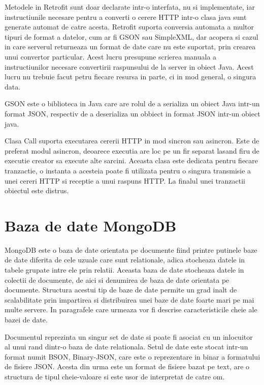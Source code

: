 Metodele in Retrofit sunt doar declarate intr-o interfata, nu si implementate, iar instructiunile necesare pentru a converti o cerere HTTP intr-o clasa java 
sunt generate automat de catre acesta. Retrofit suporta conversia automata a multor tipuri de format a datelor, cum ar fi GSON sau SimpleXML, dar acopera si 
cazul in care serverul returneaza un format de date care nu este suportat, prin crearea unui convertor particular. Acest lucru presupune scrierea 
manuala a instructiunilor necesare convertirii raspunsului de la server in obiect Java. Acest lucru nu trebuie facut petru fiecare resursa in parte, ci 
in mod general, o singura data.

GSON este o biblioteca in Java care are rolul de a serializa un obiect Java intr-un format JSON, respectiv de a deserializa un obbiect in format JSON intr-un 
obiect java.   

Clasa Call suporta executarea cererii HTTP in mod sincron sau asincron. Este de preferat modul asincron, deoarece executia are loc pe un fir separat lasand 
firu de executie creator sa execute alte sarcini. Aceasta clasa este dedicata pentru fiecare tranzactie, o instanta a acesteia poate fi utilizata pentru 
o singura transmisie a unei cereri HTTP si receptie a unui raspuns HTTP. La finalul unei tranzactii obiectul este distrus.

\section{Baza de date MongoDB}\label{sec:mongodb}
MongoDB este o baza de date orientata pe documente fiind printre putinele baze de date diferita de cele uzuale care sunt relationale, adica stocheaza datele in tabele 
grupate intre ele prin relatii. Aceasta baza de date stocheaza datele in colectii de documente, de aici si denumirea de baza de date orientata pe documente. 
Structura acestui tip de baze de date permite un grad inalt de scalabilitate prin impartirea si distribuirea unei baze de date foarte mari pe mai multe 
servere. In paragrafele care urmeaza vor fi descrise caracteristicile cheie ale bazei de date.

Documentul reprezinta un singur set de date si poate fi asociat cu un inlocuitor al unui rand dintr-o baza de date relationala. Setul de date este stocat intr-un 
format numit BSON, Binary-JSON, care este o reprezentare in binar a formatului de fisiere JSON. Acesta din urma este un format de fisiere bazat pe text,
are o structura de tipul cheie-valoare si este usor de interpretat de catre om.

